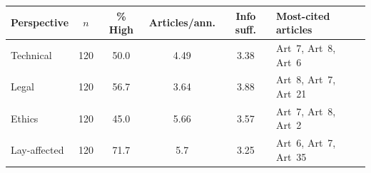 \begin{tabular}{lccccl}
\toprule
Perspective & $n$ & \% High & Articles/ann. & Info suff. & Most-cited articles \\
\midrule
Technical & 120 & 50.0 & 4.49 & 3.38 & Art~7, Art~8, Art~6 \\
Legal & 120 & 56.7 & 3.64 & 3.88 & Art~8, Art~7, Art~21 \\
Ethics & 120 & 45.0 & 5.66 & 3.57 & Art~7, Art~8, Art~2 \\
Lay-affected & 120 & 71.7 & 5.7 & 3.25 & Art~6, Art~7, Art~35 \\
\bottomrule
\end{tabular}